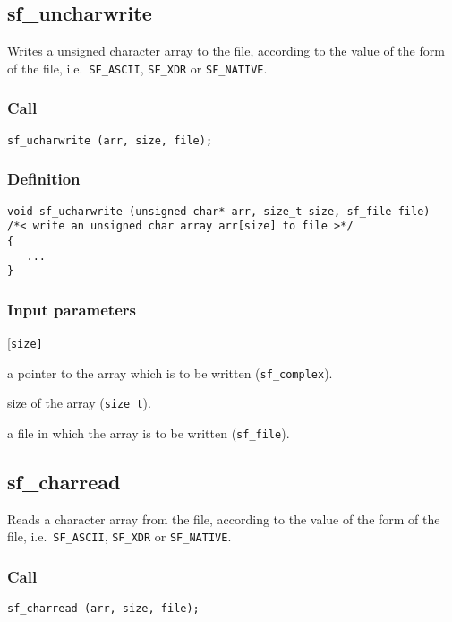 \subsection{{sf\_uncharwrite}}
Writes a unsigned character array to the file, according to the value of the form of the file, i.e.~\texttt{SF\_ASCII}, \texttt{SF\_XDR} or \texttt{SF\_NATIVE}.        

\subsubsection*{Call}
\begin{verbatim}sf_ucharwrite (arr, size, file);\end{verbatim}

\subsubsection*{Definition}
\begin{verbatim}
void sf_ucharwrite (unsigned char* arr, size_t size, sf_file file)
/*< write an unsigned char array arr[size] to file >*/
{
   ...
}
\end{verbatim}

\subsubsection*{Input parameters}
\begin{desclist}{\tt }{\quad}[\tt size]
   \setlength\itemsep{0pt}
   \item[arr]  a pointer to the array which is to be written (\texttt{sf\_complex}). 
   \item[size] size of the array (\texttt{size\_t}). 
   \item[file] a file in which the array is to be written (\texttt{sf\_file}).
\end{desclist}




\subsection{{sf\_charread}}
Reads a character array from the file, according to the value of the form of the file, i.e.~\texttt{SF\_ASCII}, \texttt{SF\_XDR} or \texttt{SF\_NATIVE}.        

\subsubsection*{Call}
\begin{verbatim}sf_charread (arr, size, file);\end{verbatim}


